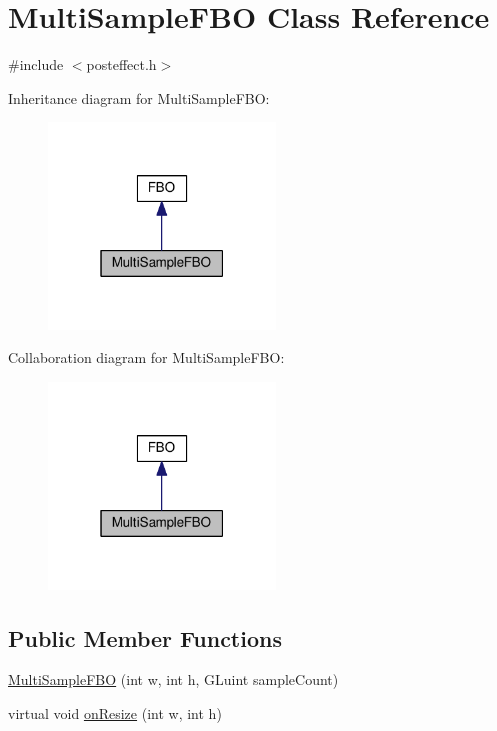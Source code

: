 \hypertarget{class_multi_sample_f_b_o}{}\section{Multi\+Sample\+F\+B\+O Class Reference}
\label{class_multi_sample_f_b_o}


{\ttfamily \#include $<$posteffect.\+h$>$}



Inheritance diagram for Multi\+Sample\+F\+B\+O\+:
\nopagebreak
\begin{figure}[H]
\begin{center}
\leavevmode
\includegraphics[width=171pt]{class_multi_sample_f_b_o__inherit__graph}
\end{center}
\end{figure}


Collaboration diagram for Multi\+Sample\+F\+B\+O\+:
\nopagebreak
\begin{figure}[H]
\begin{center}
\leavevmode
\includegraphics[width=171pt]{class_multi_sample_f_b_o__coll__graph}
\end{center}
\end{figure}
\subsection*{Public Member Functions}
\begin{DoxyCompactItemize}
\item 
\hyperlink{class_multi_sample_f_b_o_a281a5e4c378e1a344c20596ae92d41fe}{Multi\+Sample\+F\+B\+O} (int w, int h, G\+Luint sample\+Count)
\item 
virtual void \hyperlink{class_multi_sample_f_b_o_a81cc809013e98323c05712afb743ef8f}{on\+Resize} (int w, int h)
\end{DoxyCompactItemize}
